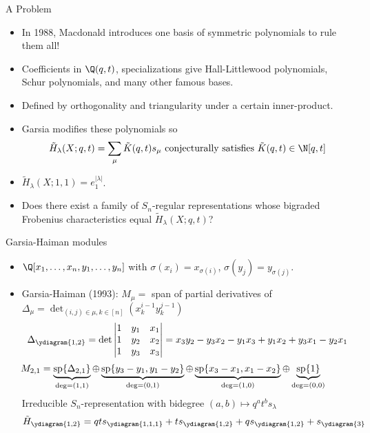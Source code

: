 \documentclass[dvipsnames]{beamer}
\renewcommand{\Span}{\operatorname{sp}}
\theoremstyle{definition}
\newcounter{c}
\begin{document}
\begin{frame}{A Problem}
  \begin{itemize}
  \item In 1988, Macdonald introduces one basis of symmetric
    polynomials to rule them all!\pause
  \item Coefficients in \(\Q(q,t)\), specializations give
    Hall-Littlewood polynomials, Schur polynomials, and many other famous bases.\pause
  \item Defined by orthogonality and triangularity under a certain
    inner-product. \pause
  \item Garsia modifies these polynomials so 
    \[
      \tilde{H}_\lambda(X;q,t) = \sum_\mu \tilde{K}(q,t) s_\mu \text{
        conjecturally satisfies }\tilde{K}(q,t) \in \N[q,t]
    \]\pause
  \item \(\tilde{H}_\lambda(X;1,1) = e_1^{|\lambda|}\).\pause
  \item Does there
    exist a family of \(S_n\)-regular representations whose bigraded
    Frobenius characteristics equal \(\tilde{H}_\lambda(X;q,t)\)?
  \end{itemize}
\end{frame}
\begin{frame}{Garsia-Haiman modules}
  \begin{itemize}
  \item \(\Q[x_1,\ldots,x_n,y_1,\ldots,y_n]\) with 
    \(\sigma(x_i) = x_{\sigma(i)}\), \(\sigma(y_j) = y_{\sigma(j)}\).\pause
  \item Garsia-Haiman (1993): \(M_\mu = \) span of partial derivatives of
    \(\Delta_\mu = \det_{(i,j) \in \mu, k \in [n]} (x_k^{i-1} y_k^{j-1})\) \pause \[
      \Delta_{\ydiagram{1,2}} = \det \left|
        \begin{matrix}
          1 & y_1 & x_1 \\
          1 & y_2 & x_2 \\
          1 & y_3 & x_3
        \end{matrix}
      \right| = x_3 y_2 - y_3 x_2 - y_1 x_3 + y_1 x_2 + y_3 x_1 - y_2 x_1
    \]
    \pause
  \[
    \hspace{-3em}
      M_{2,1} = \underbrace{\Span\{\Delta_{2,1}\}}_{\deg = (1,1)}
      \oplus \underbrace{\Span\{y_3-y_1, y_1 - y_2\}}_{\deg = (0,1)}
      \oplus \underbrace{\Span\{x_3-x_1, x_1 - x_2\}}_{\deg = (1,0)}
      \oplus \underbrace{\Span \{1\}}_{\deg = (0,0)}
    \]
    \pause
    Irreducible \(S_n\)-representation with bidegree \((a,b) \mapsto
    q^at^b s_\lambda\) \pause \[
      \tilde{H}_{\ydiagram{1,2}} = qt s_{\ydiagram{1,1,1}} + t
      s_{\ydiagram{1,2}} + q s_{\ydiagram{1,2}} + s_{\ydiagram{3}}
    \]
  \end{itemize}
\end{frame}
\end{document}
